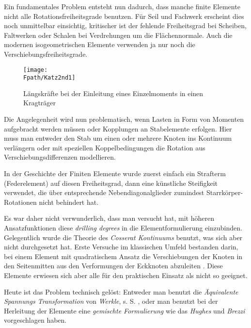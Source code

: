 Ein fundamentales Problem entsteht nun dadurch, dass manche finite Elemente nicht alle Rotationsfreiheitsgrade benutzen. F\"{u}r Seil und Fachwerk erscheint dies noch unmittelbar einsichtig, kritischer ist der fehlende Freiheitsgrad bei Scheiben, Faltwerken oder Schalen bei Verdrehungen um die Fl\"{a}chennormale. Auch die modernen isogeometrischen Elemente \cite{Hughes3} verwenden ja nur noch die Verschiebungsfreiheitsgrade.
\begin{figure}[tbp] \centering
\centering
\if {} \sidecaption[t] \fi
\texttt{[image: \\Fpath/Katz2nd1]}
\caption{L\"{a}ngskr\"{a}fte bei der Einleitung eines Einzelmoments in einen Kragtr\"{a}ger} \label{Katz2nd1}
\end{figure}%
Die Angelegenheit wird nun problematisch, wenn Lasten in Form von Momenten aufgebracht werden m\"{u}ssen oder Kopplungen an Stabelemente erfolge{\em \/}n. Hier muss man entweder den Stab um einen oder mehrere Knoten ins Kontinuum verl\"{a}ngern oder mit speziellen Koppelbedingungen die Rotation aus Verschiebungsdifferenzen modellieren.

In der Geschichte der Finiten Elemente wurde zuerst einfach ein Strafterm (Federelement) auf diesen Freiheitsgrad, dann eine k\"{u}nstliche Steifigkeit verwendet, die \"{u}ber entsprechende Nebendiagonalglieder zumindest Starrk\"{o}rper-Rotationen nicht behindert hat.

Es war daher nicht verwunderlich, dass man versucht hat, mit h\"{o}heren Ansatzfunktionen diese {\em drilling degrees \/} in die Elementformulierung einzubinden. Gelegentlich wurde die Theorie des {\em Cosserat Kontinuums\/} benutzt, was sich aber nicht durchgesetzt hat. Erste Versuche im klassischen Umfeld bestanden darin, bei einem Element mit quadratischem Ansatz die Verschiebungen der Knoten in den Seitenmitten aus den Verformungen der Eckknoten abzuleiten \cite{Allman2}. Diese Elemente erwiesen sich aber alle f\"{u}r den praktischen Einsatz als nicht so geeignet.

Heute ist das Problem technisch gel\"{o}st: Entweder man benutzt die {\em \"{A}quivalente Spannungs Transformation\/} von {\em Werkle\/}, s. S. \pageref{AST}, oder man benutzt bei der Herleitung der Elemente eine {\em gemischte Formulierung\/} wie das {\em Hughes\/} und {\em Brezzi\/} \cite{Hughes4} vorgeschlagen haben.

